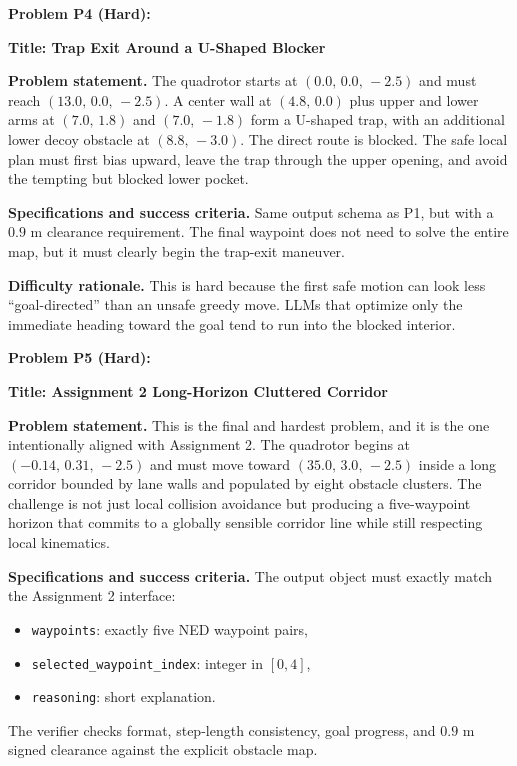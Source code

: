 \documentclass[12pt]{article}
\begin{document}
\bigskip
\textbf{Problem P4 (Hard):}

\medskip
\noindent\textbf{Title: Trap Exit Around a U-Shaped Blocker}

\noindent\textbf{Problem statement.}
The quadrotor starts at $(0.0,\,0.0,\,-2.5)$ and must reach $(13.0,\,0.0,\,-2.5)$.
A center wall at $(4.8,\,0.0)$ plus upper and lower arms at $(7.0,\,1.8)$ and
$(7.0,\,-1.8)$ form a U-shaped trap, with an additional lower decoy obstacle at
$(8.8,\,-3.0)$.
The direct route is blocked. The safe local plan must first bias upward, leave the trap through
the upper opening, and avoid the tempting but blocked lower pocket.

\noindent\textbf{Specifications and success criteria.}
Same output schema as P1, but with a $0.9$ m clearance requirement. The final waypoint does not
need to solve the entire map, but it must clearly begin the trap-exit maneuver.

\noindent\textbf{Difficulty rationale.}
This is hard because the first safe motion can look less ``goal-directed'' than an unsafe greedy
move. LLMs that optimize only the immediate heading toward the goal tend to run into the blocked
interior.

\bigskip
\textbf{Problem P5 (Hard):}

\medskip
\noindent\textbf{Title: Assignment 2 Long-Horizon Cluttered Corridor}

\noindent\textbf{Problem statement.}
This is the final and hardest problem, and it is the one intentionally aligned with Assignment 2.
The quadrotor begins at $(-0.14,\,0.31,\,-2.5)$ and must move toward
$(35.0,\,3.0,\,-2.5)$ inside a long corridor bounded by lane walls and populated by eight obstacle
clusters. The challenge is not just local collision avoidance but producing a five-waypoint horizon
that commits to a globally sensible corridor line while still respecting local kinematics.

\noindent\textbf{Specifications and success criteria.}
The output object must exactly match the Assignment 2 interface:
\begin{itemize}[leftmargin=1.2em]
  \item \texttt{waypoints}: exactly five NED waypoint pairs,
  \item \texttt{selected\_waypoint\_index}: integer in $[0,4]$,
  \item \texttt{reasoning}: short explanation.
\end{itemize}
The verifier checks format, step-length consistency, goal progress, and $0.9$ m signed
clearance against the explicit obstacle map.
\end{document}
